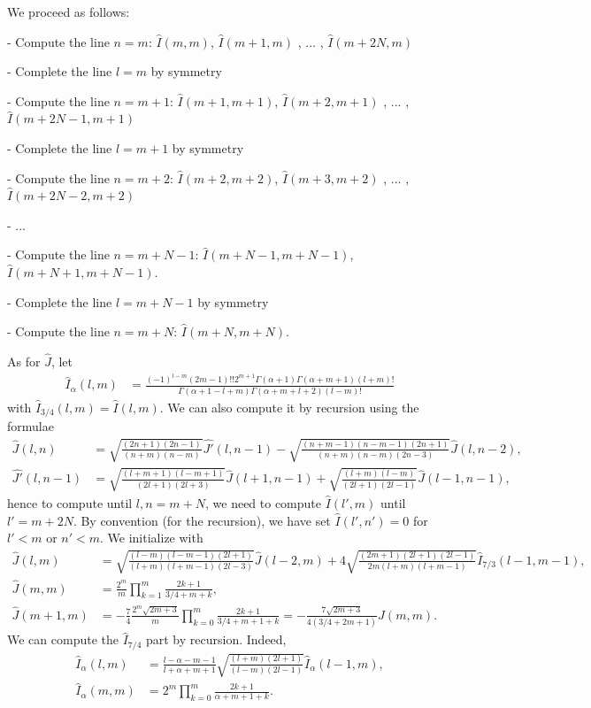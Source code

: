 \documentclass[11pt]{article}
\newcommand{\hI}{\widehat{I}}
\newcommand{\hJ}{\widehat{J}}
\newcommand{\hJp}{\widehat{J'}}
\begin{document}
We proceed as follows:

- Compute the line $n=m$: $\hI(m,m)$, $\hI(m+1,m)$ , ... , $\hI(m+2N,m)$

- Complete the line $l=m$ by symmetry

- Compute the line $n=m+1$: $\hI(m+1,m+1)$, $\hI(m+2,m+1)$ , ... , $\hI(m+2N-1,m+1)$

- Complete the line $l=m+1$ by symmetry

- Compute the line $n=m+2$: $\hI(m+2,m+2)$, $\hI(m+3,m+2)$ , ... , $\hI(m+2N-2,m+2)$

- ...

- Compute the line $n=m+N-1$: $\hI(m+N-1,m+N-1)$, $\hI(m+N+1,m+N-1)$.

- Complete the line $l=m+N-1$ by symmetry

- Compute the line $n=m+N$: $\hI(m+N,m+N)$.

As for $\hJ$, let
\begin{align}
\hI_{\alpha}(l,m) &= \frac{(-1)^{l-m}(2m-1)!!2^{m+1}\Gamma(\alpha+1)\Gamma(\alpha+m+1)(l+m)!}{\Gamma(\alpha+1-l+m)\Gamma(\alpha+m+l+2)(l-m)!} 
\end{align}
with $\hI_{3/4}(l,m) =\hI(l,m)$. We can also compute it by recursion using the formulae
\begin{align}
\hJ(l,n) &= \sqrt{\frac{(2n+1)(2n-1)}{(n+m)(n-m)}} \hJp(l,n-1)-\sqrt{\frac{(n+m-1)(n-m-1)(2n+1)}{(n+m)(n-m)(2n-3)}} \hJ(l,n-2) ,\\
\hJp(l,n-1) &= \sqrt{\frac{(l+m+1)(l-m+1)}{(2l+1)(2l+3)}} \hJ(l+1,n-1)+\sqrt{\frac{(l+m)(l-m)}{(2l+1)(2l-1)}} \hJ(l-1,n-1) ,
\end{align}
hence to compute until $l,n=m+N$, we need to compute $\hI(l',m)$ until $l'=m+2N$. By convention (for the recursion), we have set $\hI(l',n')=0$ for $l'<m$ or  $n'<m$.
We initialize with
\begin{align}
\hJ(l,m) &=\sqrt{\frac{(l-m)(l-m-1)(2l+1)}{(l+m)(l+m-1)(2l-3)}} \hJ(l-2,m)+ 4 \sqrt{\frac{(2m+1)(2l+1)(2l-1)}{2m(l+m)(l+m-1)}} \hI_{7/3}(l-1,m-1) ,\\
\hJ(m,m) &= \frac{2^m}{m} \prod_{k=1}^{m} \frac{2k+1}{3/4 + m + k} ,\\
\hJ(m+1,m) &= -\frac{7}{4}\frac{2^m\sqrt{2m+3}}{m} \prod_{k=0}^{m} \frac{2k+1}{3/4 + m + 1 +k} = -\frac{7\sqrt{2m+3}}{4(3/4+2m+1)} \hJ(m,m).
\end{align}
We can compute the $\hI_{7/4}$ part by recursion. Indeed,
\begin{align}
\hI_{\alpha}(l,m) &= \frac{l-\alpha-m-1}{l+\alpha+m+1} \sqrt{\frac{(l+m)(2l+1)}{(l-m)(2l-1)}} \hI_{\alpha}(l-1,m) ,\\
\hI_{\alpha}(m,m) &= 2^m \prod_{k=0}^{m} \frac{2k+1}{\alpha + m + 1 + k} .
\end{align}
\end{document}
